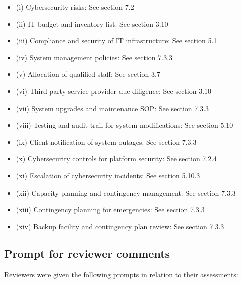 \documentclass[]{report}
\begin{document}
\begin{itemize}
\begin{itemize}
\item (i) Cybersecurity risks: See section 7.2
\item (ii) IT budget and inventory list: See section 3.10
\item (iii) Compliance and security of IT infrastructure: See section 5.1
\item (iv) System management policies: See section 7.3.3
\item (v) Allocation of qualified staff: See section 3.7
\item (vi) Third-party service provider due diligence: See section 3.10
\item (vii) System upgrades and maintenance SOP: See section 7.3.3
\item (viii) Testing and audit trail for system modifications: See section 5.10
\item (ix) Client notification of system outages: See section 7.3.3
\item (x) Cybersecurity controls for platform security: See section 7.2.4
\item (xi) Escalation of cybersecurity incidents: See section 5.10.3
\item (xii) Capacity planning and contingency management: See section 7.3.3
\item (xiii) Contingency planning for emergencies: See section 7.3.3
\item (xiv) Backup facility and contingency plan review: See section 7.3.3
\end{itemize}
\end{itemize}

\subsection{Prompt for reviewer comments}
Reviewers were given the following prompts in relation to their
assessments:
\end{document}

